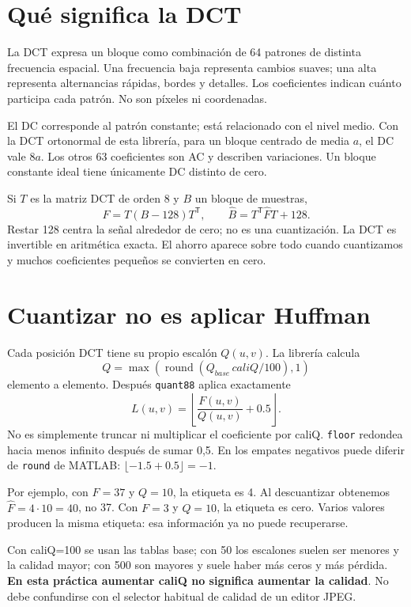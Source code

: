 \documentclass[11pt,a4paper,oneside]{report}
\begin{document}
\section{Qué significa la DCT}

La DCT expresa un bloque como combinación de 64 patrones de distinta frecuencia
espacial. Una frecuencia baja representa cambios suaves; una alta representa
alternancias rápidas, bordes y detalles. Los coeficientes indican cuánto
participa cada patrón. No son píxeles ni coordenadas.

El DC corresponde al patrón constante; está relacionado con el nivel medio.
Con la DCT ortonormal de esta librería, para un bloque centrado de media $a$,
el DC vale $8a$. Los otros 63 coeficientes son AC y describen variaciones.
Un bloque constante ideal tiene únicamente DC distinto de cero.

Si $T$ es la matriz DCT de orden 8 y $B$ un bloque de muestras,
\[
F=T(B-128)T^{\mathsf T},\qquad
\widehat B=T^{\mathsf T}\widehat F T+128.
\]
Restar 128 centra la señal alrededor de cero; no es una cuantización.
La DCT es invertible en aritmética exacta. El ahorro aparece sobre todo
cuando cuantizamos y muchos coeficientes pequeños se convierten en cero.


\section{Cuantizar no es aplicar Huffman}

Cada posición DCT tiene su propio escalón $Q(u,v)$. La librería calcula
\[
Q=\max\!\left(\operatorname{round}(Q_{base}\,caliQ/100),1\right)
\]
elemento a elemento. Después \texttt{quant88} aplica exactamente
\[
L(u,v)=\left\lfloor \frac{F(u,v)}{Q(u,v)}+0.5\right\rfloor.
\]
No es simplemente truncar ni multiplicar el coeficiente por caliQ.
\texttt{floor} redondea hacia menos infinito después de sumar 0,5.
En los empates negativos puede diferir de \texttt{round} de MATLAB:
$\lfloor-1.5+0.5\rfloor=-1$.

Por ejemplo, con $F=37$ y $Q=10$, la etiqueta es 4. Al descuantizar obtenemos
$\widehat F=4\cdot10=40$, no 37. Con $F=3$ y $Q=10$, la etiqueta es cero.
Varios valores producen la misma etiqueta: esa información ya no puede recuperarse.

Con caliQ=100 se usan las tablas base; con 50 los escalones suelen ser menores
y la calidad mayor; con 500 son mayores y suele haber más ceros y más pérdida.
\textbf{En esta práctica aumentar caliQ no significa aumentar la calidad}.
No debe confundirse con el selector habitual de calidad de un editor JPEG.
\end{document}
